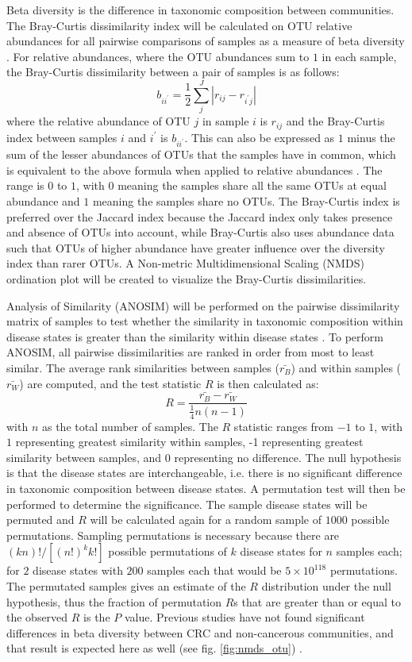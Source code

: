 \documentclass[11pt]{article}
\begin{document}
Beta diversity is the difference in taxonomic composition between communities.
The Bray-Curtis dissimilarity index will be calculated on OTU relative abundances for all pairwise comparisons of samples as a measure of beta diversity \cite{bray_ordination_1957}.
For relative abundances, where the OTU abundances sum to $1$ in each sample, the Bray-Curtis dissimilarity between a pair of samples is as follows:
$$b_{i i^\prime } = \frac{1}{2} \sum_{j}^J | r_{ij} - r_{i^\prime j} |$$
where the relative abundance of OTU $j$ in sample $i$ is $r_{ij}$ and the Bray-Curtis index between samples $i$ and $i^\prime$ is $b_{i i^\prime }$.
This can also be expressed as $1$ minus the sum of the lesser abundances of OTUs that the samples have in common, which is equivalent to the above formula when applied to relative abundances \cite{greenacre_multivariate_2014}.
The range is $0$ to $1$, with $0$ meaning the samples share all the same OTUs at equal abundance and $1$ meaning the samples share no OTUs.
The Bray-Curtis index is preferred over the Jaccard index because the Jaccard index only takes presence and absence of OTUs into account, while Bray-Curtis also uses abundance data such that OTUs of higher abundance have greater influence over the diversity index than rarer OTUs.
A Non-metric Multidimensional Scaling (NMDS) ordination plot will be created to visualize the Bray-Curtis dissimilarities.

Analysis of Similarity (ANOSIM) will be performed on the pairwise dissimilarity matrix of samples to test whether the similarity in taxonomic composition within disease states is greater than the similarity within disease states \cite{clarke_non-parametric_1993}.
To perform ANOSIM, all pairwise dissimilarities are ranked in order from most to least similar.
The average rank similarities between samples ($\bar{r_B}$) and within samples ($\bar{r_W}$) are computed, and the test statistic $R$ is then calculated as:
$$R = \frac{ \bar{r_B} - \bar{r_W} }{ \frac{1}{4} n(n-1) }$$
with $n$ as the total number of samples.
The $R$ statistic ranges from $-1$ to $1$, with $1$ representing greatest similarity within samples, -1 representing greatest similarity between samples, and $0$ representing no difference.
The null hypothesis is that the disease states are interchangeable, i.e. there is no significant difference in taxonomic composition between disease states.
A permutation test will then be performed to determine the significance.
The sample disease states will be permuted and $R$ will be calculated again for a random sample of $1000$ possible permutations.
Sampling permutations is necessary because there are $(kn)!/[(n!)^k k!]$ possible permutations of $k$ disease states for $n$ samples each;
for $2$ disease states with $200$ samples each that would be $5 \times 10^{118}$ permutations.
The permutated samples gives an estimate of the $R$ distribution under the null hypothesis,
thus the fraction of permutation $R$s that are greater than or equal to the observed $R$ is the $P$ value.
Previous studies have not found significant differences in beta diversity between CRC and non-cancerous communities, and that result is expected here as well (see fig. \ref{fig:nmds_otu}) \cite{weir_stool_2013, hannigan_diagnostic_2018, topcuoglu_framework_2020}.
\end{document}
